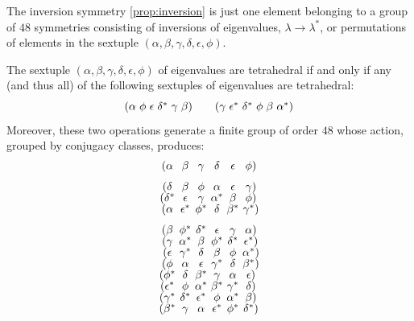 \documentclass[notitlepage, 10pt]{article}
\begin{document}
The inversion symmetry \cref{prop:inversion} is just one element belonging to a group of $48$ symmetries consisting of inversions of eigenvalues, $\lambda \rightarrow \lambda^{*}$, or permutations of elements in the sextuple $(\alpha,\beta,\gamma,\delta,\epsilon,\phi)$.

\begin{prop}
    \label{prop:tet_symmetry}
    The sextuple $(\alpha,\beta,\gamma,\delta,\epsilon,\phi)$ of eigenvalues are tetrahedral if and only if any (and thus all) of the following sextuples of eigenvalues are tetrahedral:
    \begin{equation}
        \label{eq:gens_of_tet_sym}
        \tightsextuple{(
            \alpha & \phi  & \epsilon  & \delta^{*}  & \gamma  & \beta
         )}
        \qquad
        \tightsextuple{(
            \gamma  & \epsilon^*  & \delta^{*}  & \phi  & \beta  & \alpha^*
        )}
    \end{equation}
    Moreover, these two operations generate a finite group of order $48$ whose action, grouped by conjugacy classes, produces:
    \begin{equation}
        \tightsextuple{
            (\alpha  & \beta  & \gamma  & \delta  & \epsilon  & \phi )\\[1em]
            (\delta  & \beta  & \phi  & \alpha  & \epsilon  & \gamma )\\
            (\delta^* & \epsilon  & \gamma  & \alpha^* & \beta  & \phi )\\
            (\alpha  & \epsilon^* & \phi^* & \delta  & \beta^* & \gamma^*)\\[1em]
            (\beta  & \phi^* & \delta^* & \epsilon  & \gamma  & \alpha )\\
            (\gamma  & \alpha^* & \beta  & \phi^* & \delta^* & \epsilon^*)\\
            (\epsilon  & \gamma^* & \delta  & \beta  & \phi  & \alpha^*)\\
            (\phi  & \alpha  & \epsilon  & \gamma^* & \delta  & \beta^*)\\
            (\phi^* & \delta  & \beta^* & \gamma  & \alpha  & \epsilon )\\
            (\epsilon^* & \phi  & \alpha^* & \beta^* & \gamma^* & \delta )\\
            (\gamma^* & \delta^* & \epsilon^* & \phi  & \alpha^* & \beta )\\
            (\beta^* & \gamma  & \alpha  & \epsilon^* & \phi^* & \delta^*)\\
}
\end{equation}
\end{prop}
\end{document}
